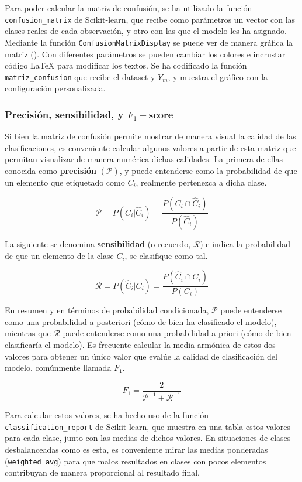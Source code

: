 				Para poder calcular la matriz de confusión, se ha utilizado la función \texttt{confusion\_matrix} de Scikit-learn, que recibe como parámetros un vector con las clases reales de cada observación, y otro con las que el modelo les ha asignado. Mediante la función \texttt{ConfusionMatrixDisplay} se puede ver de manera gráfica la matriz (). Con diferentes parámetros se pueden cambiar los colores e incrustar código \LaTeX{} para modificar los textos. Se ha codificado la función \texttt{matriz\_confusion} que recibe el dataset y $Y_m$, y muestra el gráfico con la configuración personalizada. 
				
			\subsubsection{Precisión, sensibilidad, y $F_1-$score}\label{subsub:f1}
				
				Si bien la matriz de confusión permite mostrar de manera visual la calidad de las clasificaciones, es conveniente calcular algunos valores \cite{metricas_matriz} a partir de esta matriz que permitan visualizar de manera numérica dichas calidades. La primera de ellas conocida como \textbf{precisión} $(\mathcal{P})$, y puede entenderse como la probabilidad de que un elemento que etiquetado como $C_i$, realmente pertenezca a dicha clase. 
				
				$$
				\mathcal{P} = P(C_i | \hat{C}_i) = \frac{P(C_i \cap \hat{C}_i)}{P(\hat{C}_i)}
				$$
				
				La siguiente se denomina \textbf{sensibilidad} (o recuerdo, $\mathcal{R}$) e indica la probabilidad de que un elemento de la clase $C_i$, se clasifique como tal. 
				
				$$
				\mathcal{R} = P(\hat{C}_i | C_i) = \frac{P(\hat{C}_i \cap C_i)}{P(C_i)}
				$$
				
				En resumen y en términos de probabilidad condicionada, $\mathcal{P}$ puede entenderse como una probabilidad a posteriori (cómo de bien ha clasificado el modelo), mientras que $\mathcal{R}$ puede entenderse como una probabilidad a priori (cómo de bien clasificaría el modelo). Es frecuente calcular la media armónica de estos dos valores para obtener un único valor que evalúe la calidad de clasificación del modelo, comúnmente llamada $F_1$. 
				
				$$
				F_1 = \frac{2}{\mathcal{P}^{-1} + \mathcal{R}^{-1}}
				$$
				
				Para calcular estos valores, se ha hecho uso de la función \texttt{classification\_report} de Scikit-learn, que muestra en una tabla estos valores para cada clase, junto con las medias de dichos valores. En situaciones de clases desbalanceadas como es esta, es conveniente mirar las medias ponderadas (\texttt{weighted avg}) para que malos resultados en clases con pocos elementos contribuyan de manera proporcional al resultado final. 
				

